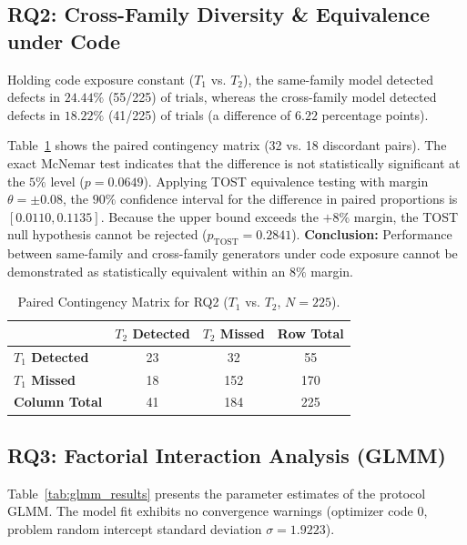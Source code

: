\documentclass[11pt,a4paper]{article}
\begin{document}
\subsection{RQ2: Cross-Family Diversity \& Equivalence under Code}
Holding code exposure constant ($T_1$ vs. $T_2$), the same-family model detected defects in $24.44\%$ (55/225) of trials, whereas the cross-family model detected defects in $18.22\%$ (41/225) of trials (a difference of $6.22$ percentage points).

Table~\ref{tab:mcnemar_rq2} shows the paired contingency matrix (32 vs. 18 discordant pairs). The exact McNemar test indicates that the difference is not statistically significant at the $5\%$ level ($p = 0.0649$). 
Applying TOST equivalence testing with margin $\theta = \pm 0.08$, the $90\%$ confidence interval for the difference in paired proportions is $[0.0110, 0.1135]$. Because the upper bound exceeds the $+8\%$ margin, the TOST null hypothesis cannot be rejected ($p_{\text{TOST}} = 0.2841$). 
\textbf{Conclusion:} Performance between same-family and cross-family generators under code exposure cannot be demonstrated as statistically equivalent within an $8\%$ margin.

\begin{table}[h]
\centering
\caption{Paired Contingency Matrix for RQ2 ($T_1$ vs. $T_2$, $N=225$).}
\label{tab:mcnemar_rq2}
\renewcommand{\arraystretch}{1.15}
\begin{tabular}{lccc}
\toprule
& \textbf{$T_2$ Detected} & \textbf{$T_2$ Missed} & \textbf{Row Total} \\
\midrule
\textbf{$T_1$ Detected} & 23 & 32 & 55 \\
\textbf{$T_1$ Missed}   & 18 & 152 & 170 \\
\midrule
\textbf{Column Total}   & 41 & 184 & 225 \\
\bottomrule
\end{tabular}
\end{table}

\subsection{RQ3: Factorial Interaction Analysis (GLMM)}
Table~\ref{tab:glmm_results} presents the parameter estimates of the protocol GLMM. The model fit exhibits no convergence warnings (optimizer code 0, problem random intercept standard deviation $\sigma = 1.9223$).
\end{document}
